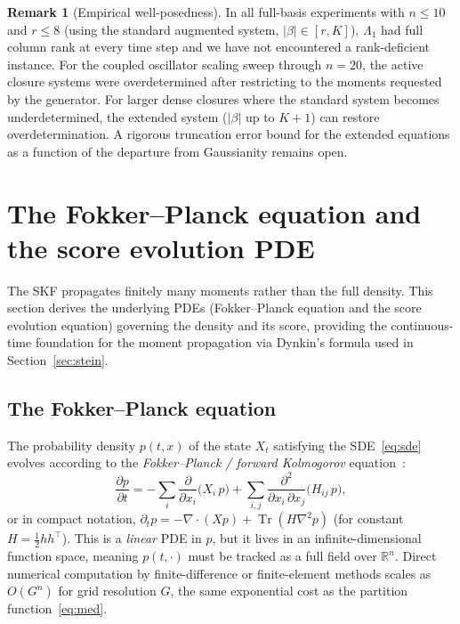 \documentclass{article}
\newcommand{\R}{\mathbb{R}}
\newcommand{\Tr}{\operatorname{Tr}}
\theoremstyle{definition}
\newtheorem{remark}{Remark}
\begin{document}
\begin{remark}[Empirical well-posedness]
\label{rem:stein-extended}
In all full-basis experiments with $n \le 10$ and $r \le 8$
(using the standard augmented system, $|\beta| \in [r, K]$),
$\Lambda_1$ had full column rank at every time step
and we have not encountered a rank-deficient instance.
For the coupled oscillator scaling sweep through $n{=}20$, the
active closure systems were overdetermined after restricting to the
moments requested by the generator. For larger dense closures where the
standard system becomes underdetermined, the extended system
($|\beta|$ up to $K{+}1$) can restore overdetermination.
A rigorous truncation error bound for the extended equations
as a function of the departure from Gaussianity remains open.
\end{remark}

\section{The Fokker--Planck equation and the score evolution PDE}
\label{app:score-pde}

The SKF propagates finitely many moments rather than the full
density.
This section derives the underlying PDEs (Fokker--Planck equation and the score evolution equation) governing the density and its score, providing the continuous-time
foundation for the moment propagation via Dynkin's formula
used in Section~\ref{sec:stein}.

\subsection{The Fokker--Planck equation}\label{app:fp}

The probability density $p(t,x)$ of the state $X_t$ satisfying
the SDE~\eqref{eq:sde} evolves according to the
\emph{Fokker--Planck / forward Kolmogorov} equation~\cite{oksendal2003}:
\begin{equation}\label{eq:app-fp}
    \frac{\partial p}{\partial t}
    = -\sum_i \frac{\partial}{\partial x_i}\bigl(X_i\, p\bigr)
    + \sum_{i,j} \frac{\partial^2}{\partial x_i\,\partial x_j}\bigl(H_{ij}\, p\bigr),
\end{equation}
or in compact notation,
$\partial_t p = -\nabla\cdot(Xp) + \Tr(H\nabla^2 p)$
(for constant $H = \frac{1}{2}hh^\top$).
This is a \emph{linear} PDE in $p$, but it lives in an
infinite-dimensional function space, meaning $p(t, \cdot)$ must be tracked
as a full field over $\R^n$.
Direct numerical computation by finite-difference or finite-element
methods scales as $O(G^n)$ for grid resolution $G$, the same
exponential cost as the partition function~\eqref{eq:med}.
\end{document}
